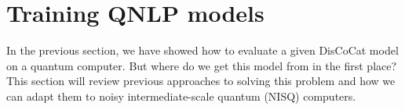 
\section{Training QNLP models}

In the previous section, we have showed how to evaluate a given DisCoCat model on a quantum computer.
But where do we get this model from in the first place?
This section will review previous approaches to solving this problem and how we can adapt them to noisy intermediate-scale quantum (NISQ) computers.
